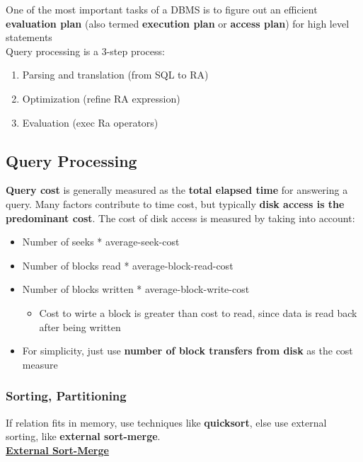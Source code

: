 One of the most important tasks of a DBMS is to figure out an efficient \textbf{evaluation plan} (also termed \textbf{execution plan} or \textbf{access plan}) for high level statements \\

Query processing is a 3-step process:
\begin{enumerate}
    \item Parsing and translation (from SQL to RA)
    \item Optimization (refine RA expression)
    \item Evaluation (exec Ra operators)
\end{enumerate}

\subsection{Query Processing}
\textbf{Query cost} is generally measured as the \textbf{total elapsed time} for answering a query. Many factors contribute to time cost, but typically \textbf{disk access is the predominant cost}. The cost of disk access is measured by taking into account:
\begin{itemize}[label=\(\rhd\)]
    \item Number of seeks * average-seek-cost
    \item Number of blocks read * average-block-read-cost
    \item Number of blocks written * average-block-write-cost
        \begin{itemize}[label=\(\rhd\)]
            \item Cost to wirte a block is greater than cost to read, since data is read back after being written
        \end{itemize}
        \item For simplicity, just use \textbf{number of block transfers from disk} as the cost measure
\end{itemize}

\subsubsection{Sorting, Partitioning}

If relation fits in memory, use techniques like \textbf{quicksort}, else use external sorting, like \textbf{external sort-merge}.\\

\noindent
\textbf{\underline{External Sort-Merge}}\\


